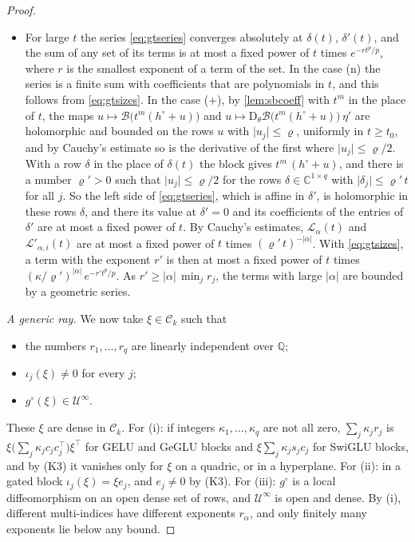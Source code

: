 \documentclass[10pt]{article}
\theoremstyle{definition}
\theoremstyle{remark}
\newcommand{\Der}{\mathrm{D}}
\begin{document}
\begin{proof}
\begin{itemize}[leftmargin=2.2em]
\item[(c)] For large $t$ the series \eqref{eq:gtseries} converges absolutely at $\delta(t)$, $\delta'(t)$, and the sum of any set of its terms is at most a fixed power of $t$ times $e^{-rt^p/p}$, where $r$ is the smallest exponent of a term of the set. In the case (n) the series is a finite sum with coefficients that are polynomials in $t$, and this follows from \eqref{eq:gtsizes}. In the case (+), by \cref{lem:sbcoeff} with $t^m$ in the place of $t$, the maps $u \mapsto \mathcal B\big(t^m(h^\circ + u)\big)$ and $u \mapsto \Der_\theta\mathcal B\big(t^m(h^\circ + u)\big)\,\eta'$ are holomorphic and bounded on the rows $u$ with $\lvert u_j\rvert \le \varrho$, uniformly in $t \ge t_0$, and by Cauchy's estimate so is the derivative of the first where $\lvert u_j\rvert \le \varrho/2$. With a row $\delta$ in the place of $\delta(t)$ the block gives $t^m\,(h^\circ + u)$, and there is a number $\varrho' > 0$ such that $\lvert u_j\rvert \le \varrho/2$ for the rows $\delta \in \mathbb C^{1\times q}$ with $\lvert\delta_j\rvert \le \varrho'\,t$ for all $j$. So the left side of \eqref{eq:gtseries}, which is affine in $\delta'$, is holomorphic in these rows $\delta$, and there its value at $\delta' = 0$ and its coefficients of the entries of $\delta'$ are at most a fixed power of $t$. By Cauchy's estimates, $\mathcal L_\alpha(t)$ and $\mathcal L'_{\alpha,i}(t)$ are at most a fixed power of $t$ times $(\varrho'\,t)^{-\lvert\alpha\rvert}$. With \eqref{eq:gtsizes}, a term with the exponent $r'$ is then at most a fixed power of $t$ times $(\kappa/\varrho')^{\lvert\alpha\rvert}\,e^{-r't^p/p}$. As $r' \ge \lvert\alpha\rvert\,\min_jr_j$, the terms with large $\lvert\alpha\rvert$ are bounded by a geometric series.
\end{itemize}

\emph{A generic ray.} We now take $\xi \in \mathcal C_k$ such that
\begin{itemize}[leftmargin=2.2em]
\item[(i)] the numbers $r_1, \dots, r_q$ are linearly independent over $\mathbb Q$;
\item[(ii)] $\iota_j(\xi) \neq 0$ for every $j$;
\item[(iii)] $g^\circ(\xi) \in \mathcal U^\infty$.
\end{itemize}
These $\xi$ are dense in $\mathcal C_k$. For (i): if integers $\kappa_1, \dots, \kappa_q$ are not all zero, $\sum_j\kappa_jr_j$ is $\xi\big(\sum_j\kappa_jc_jc_j^\top\big)\xi^\top$ for GELU and GeGLU blocks and $\xi\sum_j\kappa_js_jc_j$ for SwiGLU blocks, and by (K3) it vanishes only for $\xi$ on a quadric, or in a hyperplane. For (ii): in a gated block $\iota_j(\xi) = \xi e_j$, and $e_j \neq 0$ by (K3). For (iii): $g^\circ$ is a local diffeomorphism on an open dense set of rows, and $\mathcal U^\infty$ is open and dense. By (i), different multi-indices have different exponents $r_\alpha$, and only finitely many exponents lie below any bound.


\end{proof}
\end{document}
